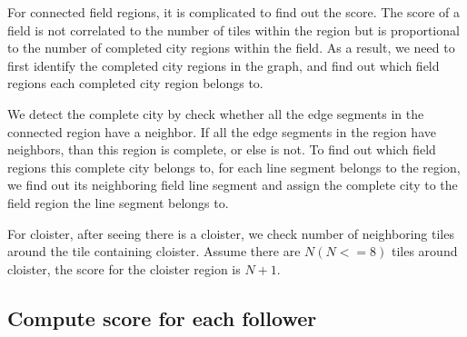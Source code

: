 For connected field regions, it is complicated to find out the score. The score of a field is not correlated to the number of tiles within the region but is proportional to the number of completed city regions within the field. As a result, we need to first identify the completed 
city regions in the graph, and find out which field regions each completed city region belongs to.

We detect the complete city by check whether all the edge segments in the connected region have a neighbor. If all the edge segments in the 
region have neighbors, than this region is complete, or else is not. To find out which field regions this complete city belongs to, for each 
line segment belongs to the region, we find out its neighboring field line segment and assign the complete city to the field region the line segment belongs to.

For cloister, after seeing there is a cloister, we check number of neighboring tiles around the tile containing cloister. Assume there are $N(N<=8)$ tiles around cloister, the score for the cloister region is $N+1$.

\subsection{Compute score for each follower}